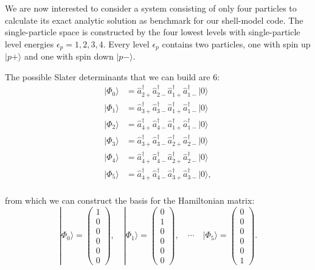 \documentclass[twoside]{article}
\newcommand{\ket}[1]{| #1 \rangle}
\begin{document}
We are now interested to consider a system consisting of only four particles to calculate its exact analytic solution as benchmark for our shell-model code. The single-particle space is constructed by the four lowest levels with single-particle level energies $\epsilon_p = 1, 2, 3, 4$. Every level $\epsilon_p$ contains two particles, one with spin up $\vert p+ \rangle$ and one with spin down $\vert p- \rangle$. 

The possible Slater determinants that we can build are 6:
\begin{align*}
\ket{\Phi_0} &= \hat a_{2+}^\dagger \hat a_{2-}^\dagger \hat a_{1+}^\dagger \hat a_{1-}^\dagger \ket{0}  \\
%
\ket{\Phi_1} &= \hat a_{3+}^\dagger \hat a_{3-}^\dagger \hat a_{1+}^\dagger \hat a_{1-}^\dagger \ket{0}  \\
%
\ket{\Phi_2} &= \hat a_{4+}^\dagger \hat a_{4-}^\dagger \hat a_{1+}^\dagger \hat a_{1-}^\dagger \ket{0}  \\
%
\ket{\Phi_3} &= \hat a_{3+}^\dagger \hat a_{3-}^\dagger \hat a_{2+}^\dagger \hat a_{2-}^\dagger \ket{0}  \\
%
\ket{\Phi_4} &= \hat a_{4+}^\dagger \hat a_{4-}^\dagger \hat a_{2+}^\dagger \hat a_{2-}^\dagger \ket{0}  \\
%
\ket{\Phi_5} &= \hat a_{4+}^\dagger \hat a_{4-}^\dagger \hat a_{3+}^\dagger \hat a_{3-}^\dagger \ket{0} , \\
\end{align*}

from which we can construct the basis for the Hamiltonian matrix:
\[ \ket{\Phi_0} = \begin{pmatrix} 1 \\ 0 \\ 0 \\ 0 \\ 0 \\ 0 \end{pmatrix}, \quad
\ket{\Phi_1} = \begin{pmatrix} 0 \\ 1 \\ 0 \\ 0 \\ 0 \\ 0 \end{pmatrix}, \quad \cdots \quad
\ket{\Phi_5} = \begin{pmatrix} 0 \\ 0 \\ 0 \\ 0 \\ 0 \\ 1 \end{pmatrix}. \]
\end{document}
